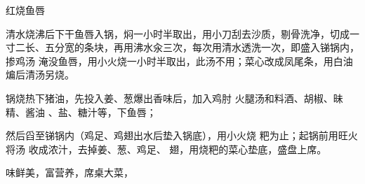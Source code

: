 \begin{recipe}{红烧鱼唇}

\ingredients


\cooking

\step 清水烧沸后下干鱼唇入锅，焖一小时半取出，用小刀刮去沙质，剔骨洗净，切成一
寸二长、五分宽的条块，再用沸水汆三次，每次用清水透洗一次，即盛入锑锅内，掺鸡汤
淹没鱼唇，用小火烧一小时半取出，此汤不用；菜心改成凤尾条，用白油煸后清汤另烧。

锅烧热下猪油，先投入姜、葱爆出香味后，加入鸡肘 火腿汤和料酒、胡椒、昧精、酱油
、盐、糖汁等，下鱼唇；

然后舀至锑锅内（鸡足、鸡翅出水后垫入锅底），用小火烧 粑为止；起锅前用旺火将汤
收成浓汁，去掉姜、葱、鸡足、 翅，用烧粑的菜心垫底，盛盘上席。

\notes

味鲜美，富营养，席桌大菜，

\end{recipe}


